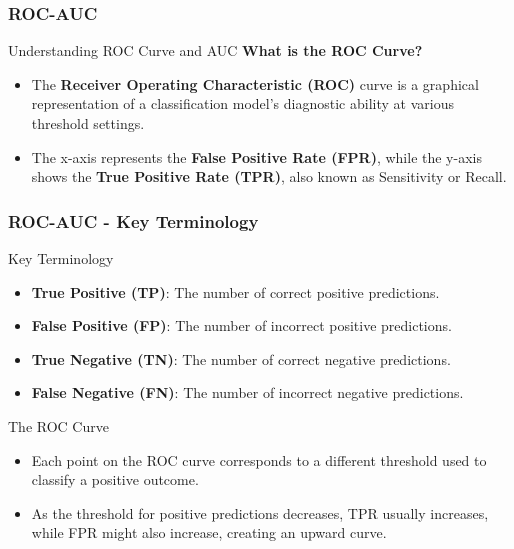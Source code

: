 \documentclass[aspectratio=169]{beamer}
\begin{document}
\begin{frame}[fragile]
  \frametitle{ROC-AUC}
  \begin{block}{Understanding ROC Curve and AUC}
    \textbf{What is the ROC Curve?}
    \begin{itemize}
      \item The \textbf{Receiver Operating Characteristic (ROC)} curve is a graphical representation of a classification model's diagnostic ability at various threshold settings. 
      \item The x-axis represents the \textbf{False Positive Rate (FPR)}, while the y-axis shows the \textbf{True Positive Rate (TPR)}, also known as Sensitivity or Recall.
    \end{itemize}
  \end{block}
\end{frame}

\begin{frame}[fragile]
  \frametitle{ROC-AUC - Key Terminology}
  \begin{block}{Key Terminology}
    \begin{itemize}
      \item \textbf{True Positive (TP)}: The number of correct positive predictions.
      \item \textbf{False Positive (FP)}: The number of incorrect positive predictions.
      \item \textbf{True Negative (TN)}: The number of correct negative predictions.
      \item \textbf{False Negative (FN)}: The number of incorrect negative predictions.
    \end{itemize}
  \end{block}

  \begin{block}{The ROC Curve}
    \begin{itemize}
      \item Each point on the ROC curve corresponds to a different threshold used to classify a positive outcome.
      \item As the threshold for positive predictions decreases, TPR usually increases, while FPR might also increase, creating an upward curve.
    \end{itemize}
  \end{block}
\end{frame}
\end{document}
